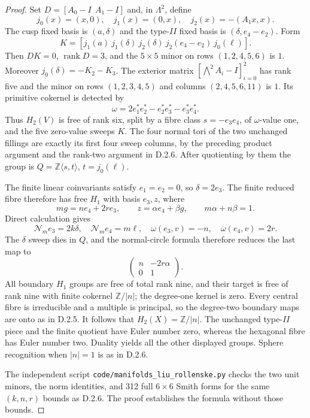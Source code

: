 \begin{proof}
Set $D=[A_0-I\ \ A_1-I]$ and, in $\Lambda^2$, define
\[
 j_0(x)=(x,0),\quad j_1(x)=(0,x),\quad
 j_2(x)=-(A_1x,x).
\]
The cusp fixed basis is $(a,\delta)$ and the type-$II$ fixed
basis is $(\delta,e_4-e_2)$. Form
\[
 K=[j_1(a)\ j_1(\delta)\ j_2(\delta)\
       j_2(e_4-e_2)\ j_0(\ell)].
\]
Then $DK=0$, $\operatorname{rank}D=3$, and the $5\times5$
minor on rows $(1,2,4,5,6)$ is $1$.
Moreover $j_0(\delta)=-K_2-K_3$.
The exterior matrix $[\bigwedge^2A_i-I]_{i=0}^2$ has rank
five and the minor on rows $(1,2,3,4,5)$ and columns
$(2,4,5,6,11)$ is $1$. Its primitive cokernel is detected by
\[
 \omega=2e_1^*e_2^*-e_2^*e_3^*-e_3^*e_4^*.
\]
Thus $H_2(V)$ is free of rank six, split by a fibre class
$s=-e_3e_4$, of $\omega$-value one, and the five zero-value
sweeps $K$. The four normal tori of the two unchanged fillings
are exactly its first four sweep columns, by the preceding
product argument and the rank-two argument in D.2.6.
After quotienting by them the group is
$Q=\mathbb Z\langle s,t\rangle$, $t=j_0(\ell)$.

The finite linear coinvariants satisfy $e_1=e_2=0$, so
$\delta=2e_3$. The finite reduced fibre therefore has free
$H_1$ with basis $e_3,z$, where
\[
 mg=ne_4+2r e_3,\qquad z=\alpha e_4+\beta g,
 \qquad m\alpha+n\beta=1.
\]
Direct calculation gives
\[
 \mathcal N_me_3=2k\delta,\quad
 \mathcal N_me_4=m\ell,\quad
 \omega(e_3,v)=-n,\quad \omega(e_4,v)=2r.
\]
The $\delta$ sweep dies in $Q$, and the normal-circle formula
therefore reduces the last map to
\[
 \begin{pmatrix}n&-2r\alpha\\0&1\end{pmatrix}.
\]
All boundary $H_1$ groups are free of total rank nine, and their
target is free of rank nine with finite cokernel
$\mathbb Z/|n|$; the degree-one kernel is zero.
Every central fibre is irreducible and a multiple is principal,
so the degree-two boundary maps are onto as in D.2.5.
It follows that $H_2(X)=\mathbb Z/|n|$.
The unchanged type-$II$ piece and the finite quotient have
Euler number zero, whereas the hexagonal fibre has Euler
number two. Duality yields all the other displayed groups.
Sphere recognition when $|n|=1$ is as in D.2.6.

The independent script
\texttt{code/manifolds\_liu\_rollenske.py} checks the two
unit minors, the norm identities, and 312 full $6\times6$
Smith forms for the same $(k,n,r)$ bounds as D.2.6.
The proof establishes the formula without those bounds.
\end{proof}

